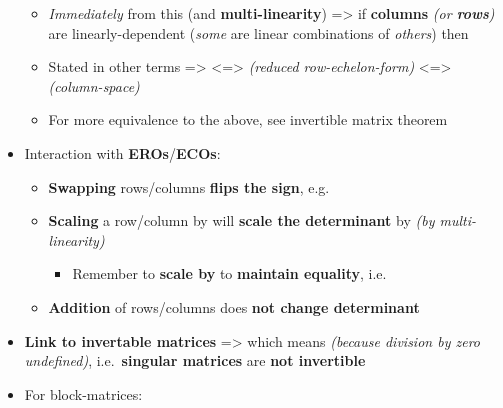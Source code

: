 \begin{itemize}
  \begin{itemize}
  
  \item
    \emph{Immediately} from this (and \textbf{multi-linearity})
    =\textgreater{} if \textbf{columns} \emph{(or \textbf{rows})} are
    linearly-dependent (\emph{some} are linear combinations of
    \emph{others}) then 
  \item
    Stated in other terms =\textgreater{}
     \textless=\textgreater{}
     \emph{(reduced
    row-echelon-form)} \textless=\textgreater{}
    \emph{(column-space)}
  \item
    For more equivalence to the above, see invertible matrix theorem
  \end{itemize}
\item
  Interaction with \textbf{EROs}/\textbf{ECOs}:

  \begin{itemize}
  
  \item
    \textbf{Swapping} rows/columns \textbf{flips the sign},
    e.g.~
  \item
    \textbf{Scaling} a row/column by  will
    \textbf{scale the determinant} by \iMbox{\lambda} \emph{(by
    multi-linearity)}

    \begin{itemize}
    
    \item
      Remember to \textbf{scale by } to
      \textbf{maintain equality},
      i.e.~
    \end{itemize}
  \item
    \textbf{Addition} of rows/columns does \textbf{not change
    determinant}
  \end{itemize}
\item
  \textbf{Link to invertable matrices} =\textgreater{}
   which means
   \emph{(because
  division by zero undefined)}, i.e.~\textbf{singular matrices} are
  \textbf{not invertible}
\item
  For block-matrices:


\end{itemize}

